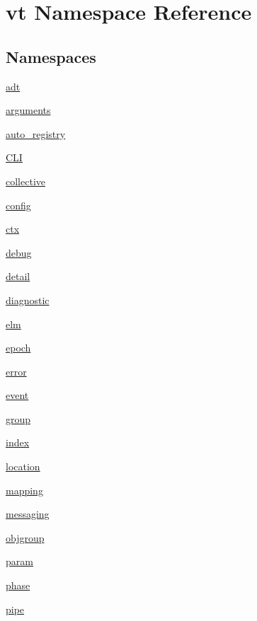 \hypertarget{namespacevt}{}\section{vt Namespace Reference}
\label{namespacevt}
\subsection*{Namespaces}
\begin{DoxyCompactItemize}
\item 
 \hyperlink{namespacevt_1_1adt}{adt}
\item 
 \hyperlink{namespacevt_1_1arguments}{arguments}
\item 
 \hyperlink{namespacevt_1_1auto__registry}{auto\+\_\+registry}
\item 
 \hyperlink{namespacevt_1_1_c_l_i}{C\+LI}
\item 
 \hyperlink{namespacevt_1_1collective}{collective}
\item 
 \hyperlink{namespacevt_1_1config}{config}
\item 
 \hyperlink{namespacevt_1_1ctx}{ctx}
\item 
 \hyperlink{namespacevt_1_1debug}{debug}
\item 
 \hyperlink{namespacevt_1_1detail}{detail}
\item 
 \hyperlink{namespacevt_1_1diagnostic}{diagnostic}
\item 
 \hyperlink{namespacevt_1_1elm}{elm}
\item 
 \hyperlink{namespacevt_1_1epoch}{epoch}
\item 
 \hyperlink{namespacevt_1_1error}{error}
\item 
 \hyperlink{namespacevt_1_1event}{event}
\item 
 \hyperlink{namespacevt_1_1group}{group}
\item 
 \hyperlink{namespacevt_1_1index}{index}
\item 
 \hyperlink{namespacevt_1_1location}{location}
\item 
 \hyperlink{namespacevt_1_1mapping}{mapping}
\item 
 \hyperlink{namespacevt_1_1messaging}{messaging}
\item 
 \hyperlink{namespacevt_1_1objgroup}{objgroup}
\item 
 \hyperlink{namespacevt_1_1param}{param}
\item 
 \hyperlink{namespacevt_1_1phase}{phase}
\item 
 \hyperlink{namespacevt_1_1pipe}{pipe}
\item 

\end{DoxyCompactItemize}
